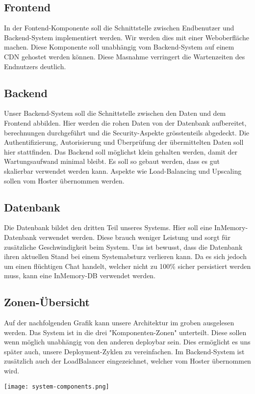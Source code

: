 	\subsection{Frontend}
	In der Fontend-Komponente soll die Schnittstelle zwischen Endbenutzer und Backend-System implementiert werden. Wir werden dies mit einer Weboberfläche machen. Diese Komponente soll unabhängig vom Backend-System auf einem CDN gehostet werden können. Diese Masnahme verringert die Wartenzeiten des Endnutzers deutlich.
	\subsection{Backend}
	Unser Backend-System soll die Schnittstelle zwischen den Daten und dem Frontend abbilden. Hier werden die rohen Daten von der Datenbank aufbereitet, berechnungen durchgeführt und die Security-Aspekte grösstenteils abgedeckt. Die Authentifizierung, Autorisierung und Überprüfung der übermittelten Daten soll hier stattfinden. Das Backend soll möglichst klein gehalten werden, damit der Wartungsaufwand minimal bleibt. Es soll so gebaut werden, dass es gut skalierbar verwendet werden kann. Aspekte wie Load-Balancing und Upscaling sollen vom Hoster übernommen werden.
	\subsection{Datenbank}
	Die Datenbank bildet den dritten Teil unseres Systems. Hier soll eine InMemory-Datenbank verwendet werden. Diese brauch weniger Leistung und sorgt für zusätzliche Geschwindigkeit beim System. Uns ist bewusst, dass die Datenbank ihren aktuellen Stand bei einem Systemabsturz verlieren kann. Da es sich jedoch um einen flüchtigen Chat handelt, welcher nicht zu 100\% sicher persistiert werden muss, kann eine InMemory-DB verwendet werden.

	\newpage

	\subsection{Zonen-Übersicht}
	Auf der nachfolgenden Grafik kann unsere Architektur im groben ausgelesen werden. Das System ist in die drei "Komponenten-Zonen" unterteilt. Diese sollen wenn möglich unabhängig von den anderen deploybar sein. Dies ermöglicht es uns später auch, unsere Deployment-Zyklen zu vereinfachen. Im Backend-System ist zusätzlich auch der LoadBalancer eingezeichnet, welcher vom Hoster übernommen wird.

	\noindent
	\texttt{[image: system-components.png]}

